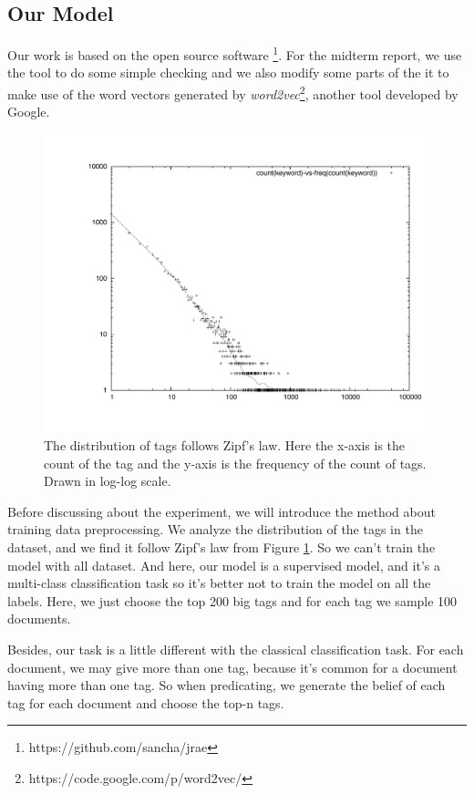 \documentclass[dvips,9pt]{article}
\begin{document}
        \subsection{Our Model}
        Our work is based on the open source software \footnote{https://github.com/sancha/jrae}. For the midterm report, we use the tool to do some simple checking and we also modify some parts of the it to make use of the word vectors generated by \emph{word2vec}\footnote{https://code.google.com/p/word2vec/}, another tool developed by Google.
        
         \begin{figure}
         \includegraphics[scale=0.5]{dist.pdf}
         \caption{The distribution of tags follows Zipf's law. Here the x-axis is the count of the tag and the y-axis is the frequency of the count of tags. Drawn in log-log scale.}
         \label{zips}
        \end{figure}
        
        Before discussing about the experiment, we will introduce the method about training data preprocessing. We analyze the distribution of the tags in the dataset, and we find it follow Zipf's law from Figure \ref{zips}. So we can't train the model with all dataset. And here, our model is a supervised model, and it's a multi-class classification task so it's better not to train the model on all the labels. Here, we just choose the top 200 big tags and for each tag we sample 100 documents.
        
        Besides, our task is a little different with the classical classification task. For each document, we may give more than one tag, because it's common for a document having more than one tag. So when predicating, we generate the belief of each tag for each document and choose the top-n tags.
        
\end{document}
